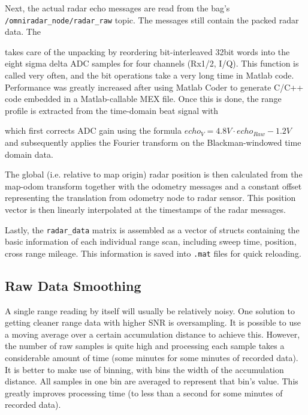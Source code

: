 Next, the actual radar echo messages are read from the bag's \texttt{/omniradar\_node/radar\_raw} topic. The messages still contain the packed radar data. The
\begin{Shaded}
\begin{Highlighting}[]
\end{Highlighting}
\end{Shaded}
takes care of the unpacking by reordering bit-interleaved 32bit words into the eight sigma delta ADC samples for four channels (Rx1/2, I/Q). This function is called very often, and the bit operations take a very long time in Matlab code. Performance was greatly increased after using Matlab Coder to generate C/C++ code embedded in a Matlab-callable MEX file. Once this is done, the range profile is extracted from the time-domain beat signal with
\begin{Shaded}
\begin{Highlighting}[]
\end{Highlighting}
\end{Shaded}
which first corrects ADC gain using the formula $echo_{V} = 4.8V \cdot echo_{Raw} - 1.2V$ and subsequently applies the Fourier transform on the Blackman-windowed time domain data.

The global (i.e. relative to map origin) radar position is then calculated from the map-odom transform together with the odometry messages and a constant offset representing the translation from odometry node to radar sensor. This position vector is then linearly interpolated at the timestamps of the radar messages.

Lastly, the \texttt{radar\_data} matrix is assembled as a vector of structs containing the basic information of each individual range scan, including sweep time, position, cross range mileage. This information is saved into \texttt{.mat} files for quick reloading.

\subsection{Raw Data Smoothing}\label{raw-data-smoothing}

A single range reading by itself will usually be relatively
noisy. One solution to getting cleaner range data with higher SNR is
oversampling. It is possible to use a moving average over a certain
accumulation distance to achieve this. However, the number of raw
samples is quite high and processing each sample takes a considerable
amount of time (some minutes for some minutes of recorded data). It is
better to make use of binning, with bins the width of the accumulation
distance. All samples in one bin are averaged to represent that bin's
value. This greatly improves processing time (to less than a second for
some minutes of recorded data).

